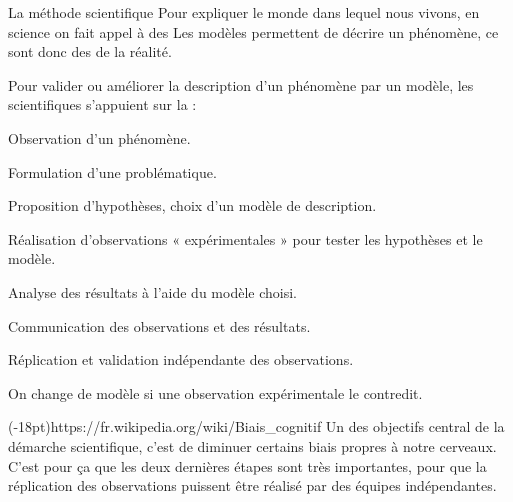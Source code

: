 \begin{doc}{La méthode scientifique}
  Pour expliquer le monde dans lequel nous vivons, en science on fait appel à des  
  Les modèles permettent de décrire un phénomène, ce sont donc des  de la réalité.

  Pour valider ou améliorer la description d'un phénomène par un modèle, les scientifiques s'appuient sur la  :
  \begin{enumeration}
    \item Observation d'un phénomène.
    \item Formulation d'une problématique.
    \item Proposition d'hypothèses, choix d'un modèle de description.
    \item Réalisation d'observations « expérimentales » pour tester les hypothèses et le modèle.
    \item Analyse des résultats à l'aide du modèle choisi.
    \item Communication des observations et des résultats.
    \item Réplication et validation indépendante des observations.
  \end{enumeration}

  \flecheLongue On change de modèle si une observation expérimentale le contredit.
  \bigskip

  \qrcode(-18pt){https://fr.wikipedia.org/wiki/Biais_cognitif}
  Un des objectifs central de la démarche scientifique, c'est de diminuer certains biais propres à notre cerveaux.
  C'est pour ça que les deux dernières étapes sont très importantes, pour que la réplication des observations puissent être réalisé par des équipes indépendantes.
\end{doc}


